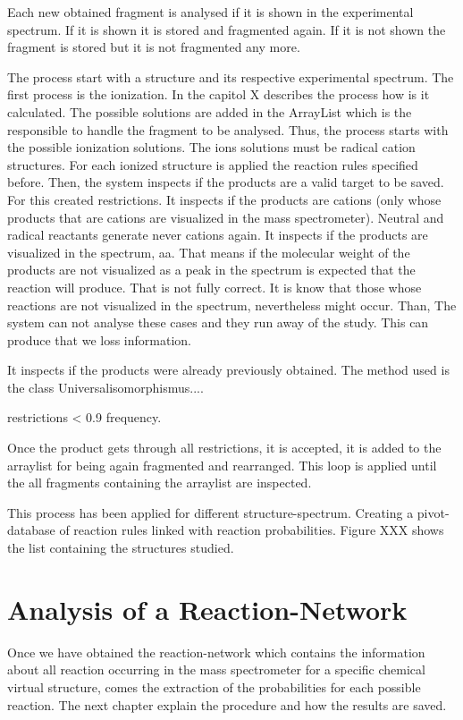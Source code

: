 \documentclass[10pt]{bmc_article}
\newenvironment{bmcformat}{\begin{raggedright}\baselineskip20pt\sloppy\setboolean{publ}{false}}{\end{raggedright}\baselineskip20pt\sloppy}
\begin{document}
\begin{bmcformat}
Each new obtained fragment is analysed if it is shown in the experimental 
spectrum. If it is shown it is stored and fragmented again. If it is not shown 
the fragment is stored but it is not fragmented any more.


The process start with a structure and its respective experimental spectrum. 
The first process is the ionization. In the capitol X describes the process how 
is it calculated. The possible solutions are added in the ArrayList which is 
the responsible to handle the fragment to be analysed. Thus, the process starts 
with the possible ionization solutions. The ions solutions must be radical 
cation structures. For each ionized structure is applied the reaction rules 
specified before. Then, the system inspects if the products are a valid target 
to be saved. For this created restrictions. It inspects if the products are 
cations (only whose products that are cations are visualized in the mass 
spectrometer). Neutral and radical reactants generate never cations again. It 
inspects if the products are visualized in the spectrum, aa. That means if the 
molecular weight of the products are not visualized as a peak in the spectrum 
is expected that the reaction will produce. That is not fully correct. It is 
know that those whose reactions are not visualized in the spectrum, 
nevertheless might occur. Than, The system can not analyse these cases and they 
run away of the study. This can produce that  we loss information.

It inspects if the products were already previously obtained. The method used 
is the class Universalisomorphismus....

restrictions < 0.9 frequency.



Once the product gets through all restrictions, it is accepted, it is added to 
the arraylist for being again fragmented and rearranged. This loop is applied 
until the all fragments containing the arraylist are inspected.


This process has been applied for different structure-spectrum. Creating a 
pivot-database of reaction rules linked with reaction probabilities. Figure XXX shows the list containing the structures studied.

\section{Analysis of a Reaction-Network}


Once we have obtained the reaction-network which contains the information about 
all reaction occurring in the mass spectrometer for a specific chemical virtual 
structure, comes the extraction of the probabilities for each possible 
reaction. The next chapter explain the procedure and how the results are saved.


\end{bmcformat}
\end{document}
